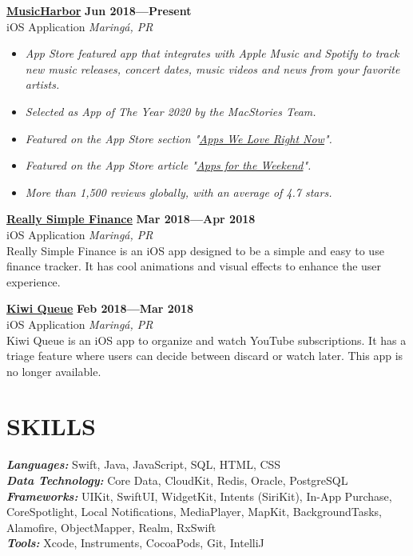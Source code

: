 \documentclass[line,margin]{res}
\begin{document}
\begin{resume}
  {\bf \href{https://apps.apple.com/us/app/musicharbor/id1440405750}{MusicHarbor}} \hfill {\bf Jun 2018---Present} \\
  iOS Application \hfill {\sl Maring\'a, PR}\\[-6pt]
    \begin{itemize}
    \item {\sl App Store featured app that integrates with Apple Music and Spotify to track new music releases,  concert dates,  music videos and news from your favorite artists.}
    \item {\sl Selected as App of The Year 2020 by the MacStories Team.}
    \item {\sl Featured on the App Store section "\href{https://github.com/marcosatanaka/resume-latex/blob/master/images/apps_we_love_right_now.png?raw=true}{Apps We Love Right Now}".}
    \item {\sl Featured on the App Store article "\href{https://apps.apple.com/us/story/id1516537723}{Apps for the Weekend}".}
    \item {\sl More than 1,500 reviews globally, with an average of 4.7 stars.}
    \end{itemize}

  {\bf \href{https://itunes.apple.com/us/app/really-simple-finance/id1370859710}{Really Simple Finance}} \hfill {\bf Mar 2018---Apr 2018} \\
  iOS Application \hfill {\sl Maring\'a, PR}\\[6pt]
  Really Simple Finance is an iOS app designed to be a simple and easy to use finance tracker.
  It has cool animations and visual effects to enhance the user experience.

  {\bf \href{https://itunes.apple.com/us/app/kiwi-queue/id1352747116}{Kiwi Queue}} \hfill {\bf Feb 2018---Mar 2018} \\
  iOS Application \hfill {\sl Maring\'a, PR}\\[6pt]
  Kiwi Queue is an iOS app to organize and watch YouTube subscriptions.
  It has a triage feature where users can decide between discard or watch later.  This app is no longer available.


\section{SKILLS}
  {\sl {\bf Languages:}} Swift, Java, JavaScript, SQL, HTML, CSS \\
  {\sl {\bf Data Technology:}} Core Data, CloudKit, Redis, Oracle, PostgreSQL \\
  {\sl {\bf Frameworks:}} UIKit, SwiftUI, WidgetKit, Intents (SiriKit), In-App Purchase, CoreSpotlight, Local Notifications, MediaPlayer, MapKit, BackgroundTasks, Alamofire, ObjectMapper, Realm, RxSwift \\
  {\sl {\bf Tools:}} Xcode, Instruments, CocoaPods, Git, IntelliJ



\end{resume}
\end{document}
